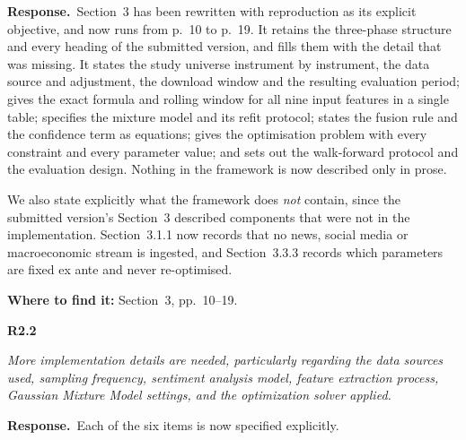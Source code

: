 \documentclass[11pt,a4paper]{article}
\newcommand{\rc}[2]{%
  \par\medskip\noindent
  \colorbox{qbg}{\parbox{\dimexpr\linewidth-2\fboxsep}{%
  \textbf{#1}\par\smallskip\itshape #2}}\par\nopagebreak}
\newcommand{\resp}{\par\medskip\noindent\textbf{Response.}\ }
\newcommand{\where}[1]{\par\smallskip\noindent\textcolor{blue!55!black}{\textbf{Where to find it:} #1}\par}
\begin{document}
\resp Section~3 has been rewritten with reproduction as its explicit objective, and now
runs from p.~10 to p.~19. It retains the three-phase structure and every heading of the
submitted version, and fills them with the detail that was missing. It states the study
universe instrument by instrument, the data source and adjustment, the download window and
the resulting evaluation period; gives the exact formula and rolling window for all nine
input features in a single table; specifies the mixture model and its refit protocol;
states the fusion rule and the confidence term as equations; gives the optimisation problem
with every constraint and every parameter value; and sets out the walk-forward protocol and
the evaluation design. Nothing in the framework is now described only in prose.

We also state explicitly what the framework does \emph{not} contain, since the submitted
version's Section~3 described components that were not in the implementation. Section~3.1.1
now records that no news, social media or macroeconomic stream is ingested, and
Section~3.3.3 records which parameters are fixed ex ante and never re-optimised.
\where{Section~3, pp.~10--19.}

\rc{R2.2}{More implementation details are needed, particularly regarding the data sources
used, sampling frequency, sentiment analysis model, feature extraction process, Gaussian
Mixture Model settings, and the optimization solver applied.}

\resp Each of the six items is now specified explicitly.
\end{document}
